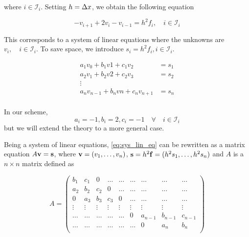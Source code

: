 \documentclass[a4paper]{article}
\begin{document}
where $i \in \mathcal{I}_i$. Setting $h = {\Delta x}$, we obtain the following equation

\begin{equation}
-v_{i+1} + 2v_{i} - v_{i-1}  = h^2 f_i, \quad i \in \mathcal{I}_i
\label{ddu_dxx_disc}
\end{equation}

This corresponds to a system of linear equations where the unknowns are $v_i, \quad i \in \mathcal{I}_i$. To save space, we introduce $s_i = h^2 f_i, i \in \mathcal{I}_i$.

\begin{equation}\label{eq:sys_lin_eq}
    \begin{array}{cccc}
        a_1 v_{0} + b_1 v{1} + c_1 v_{2} &= s_1 \\
        a_2 v_{1} + b_2 v{2} + c_2 v_{3} &= s_2 \\
        \vdots \\
        a_n v_{n-1} + b_n v{n} + c_n v_{n+1} &= s_n \\
    \end{array}
\end{equation}

In our scheme,
\begin{equation}
a_i = -1, b_i = 2, c_i = -1 \quad \forall \quad i \in \mathcal{I}_i
\label{eq:spec_abc}
\end{equation}
but we will extend the theory to a more general case.

Being a system of linear equations, \eqref{eq:sys_lin_eq} can be rewritten as a matrix equation $A {\bf v} = {\bf s}$, where ${\bf v} = (v_1, \dots, v_{n})$, ${\bf s} = h^2 {\bf f} = (h^2 s_1, \dots, h^2 s_{n})$ and $A$ is a $n \times n$ matrix defined as

\begin{equation}
     A = \left(\begin{array}{ccccccccc}
                   b_1 & c_1 & 0 &\dots   & \dots &\dots & \dots &\dots&\dots\\
                   a_2 & b_2 & c_2 & 0 &\dots &\dots & \dots&\dots&\dots \\
                   0 & a_3 & b_3 & c_3 & 0 & \dots & \dots&\dots&\dots \\
                   \vdots&\vdots&\vdots&\vdots&\vdots&\vdots&\vdots&\vdots&\vdots \\
                   \dots&\dots&\dots&\dots&\dots & 0 & a_{n-1}  &b_{n-1}& c_{n-1} \\
                   \dots&\dots&\dots&\dots&\dots&\dots &  0 &a_n & b_n \\
              \end{array} \right)
\end{equation}
\end{document}
